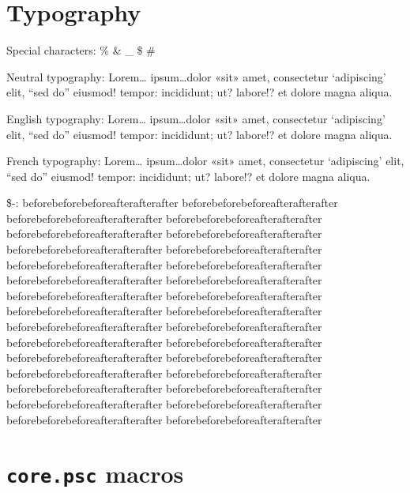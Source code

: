 \documentclass[demo]{pyscribe}
\begin{document}
\begin{center}
{\LARGE \@maintitle \par}
\end{center}
\makeatother
\newpage

\renewcommand\contentsname{Sommaire}
\tableofcontents



\chapter{Typography}

Special characters: \% \& \_ \$ \#

Neutral typography: Lorem\dots{} ipsum\dots{}dolor «sit» amet, consectetur `adipiscing' elit, “sed do” eiusmod! tempor: incididunt; ut? labore!? et dolore magna aliqua. \par
English typography: Lorem\dots{} ipsum\dots{}dolor «sit» amet, consectetur `adipiscing' elit, “sed do” eiusmod! tempor: incididunt; ut? labore!? et dolore magna aliqua. \par
French typography: Lorem\dots{} ipsum\dots{}dolor «sit» amet, consectetur `adipiscing' elit, “sed do” eiusmod! tempor: incididunt; ut? labore!? et dolore magna aliqua. \par

\par\$-: beforebeforebefore\-afterafterafter beforebeforebefore\-afterafterafter beforebeforebefore\-afterafterafter beforebeforebefore\-afterafterafter beforebeforebefore\-afterafterafter beforebeforebefore\-afterafterafter beforebeforebefore\-afterafterafter beforebeforebefore\-afterafterafter beforebeforebefore\-afterafterafter beforebeforebefore\-afterafterafter 
beforebeforebefore\-afterafterafter beforebeforebefore\-afterafterafter beforebeforebefore\-afterafterafter beforebeforebefore\-afterafterafter beforebeforebefore\-afterafterafter beforebeforebefore\-afterafterafter beforebeforebefore\-afterafterafter beforebeforebefore\-afterafterafter beforebeforebefore\-afterafterafter beforebeforebefore\-afterafterafter 
beforebeforebefore\-afterafterafter beforebeforebefore\-afterafterafter beforebeforebefore\-afterafterafter beforebeforebefore\-afterafterafter beforebeforebefore\-afterafterafter beforebeforebefore\-afterafterafter beforebeforebefore\-afterafterafter beforebeforebefore\-afterafterafter beforebeforebefore\-afterafterafter beforebeforebefore\-afterafterafter 

\chapter{\texttt{core.psc} macros}
\end{document}
